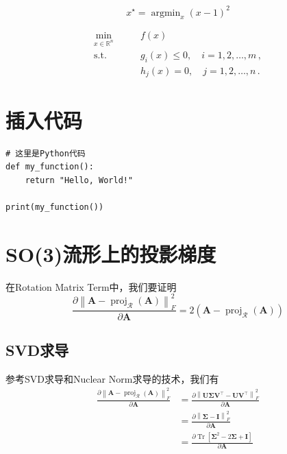 \documentclass[11pt,a4paper,UTF8]{ctexart}
\begin{document}
\begin{equation*}
    x^\star = \mathop{\arg\min}_x (x-1)^2
\end{equation*}

\begin{equation*}
\begin{aligned}
\min_{x\in \mathbb{R}^n} \quad & \quad f(x)  \\
\mathrm{s.t.} \quad & \quad g_i(x) \le 0, \quad i = 1, 2, \ldots, m \,, \\
& \quad h_j(x) = 0, \quad j = 1, 2, \ldots, n \,. 
\end{aligned}
\end{equation*}




\newpage
\section{插入代码}


\begin{lstlisting}[style=python]
# 这里是Python代码
def my_function():
    return "Hello, World!"

print(my_function())
\end{lstlisting}



\newpage
{\small

}

\newpage
\appendix
\section{SO(3)流形上的投影梯度}
\label{sec:SO3}
在Rotation Matrix Term中，我们要证明
\begin{equation*}
    \frac{\partial \left\| \mathbf{A}-\operatorname{proj}_{\mathcal{R}}(\mathbf{A}) \right\|_F^2}{\partial \mathbf{A}}=2\left( \mathbf{A}-\operatorname{proj}_{\mathcal{R}}(\mathbf{A}) \right)
\end{equation*}



\subsection{SVD求导}
参考SVD求导和Nuclear Norm求导的技术，我们有
\begin{equation*}
\begin{aligned}
\frac{\partial \left\| \mathbf{A}-\operatorname{proj}_{\mathcal{R}}(\mathbf{A}) \right\|_F^2}{\partial \mathbf{A}}&=\frac{\partial \left\| \mathbf{U}\bm{\Sigma}\mathbf{V}^{\top}-\mathbf{U}\mathbf{V}^{\top} \right\|_F^2}{\partial \mathbf{A}}\\
&= \frac{\partial \left\| \bm{\Sigma}-\mathbf{I} \right\|_F^2}{\partial \mathbf{A}}\\
&= \frac{\partial \operatorname{Tr}\left[ \bm{\Sigma}^2-2\bm{\Sigma}+\mathbf{I} \right] }{\partial \mathbf{A}}
\end{aligned}
\end{equation*}
\end{document}
